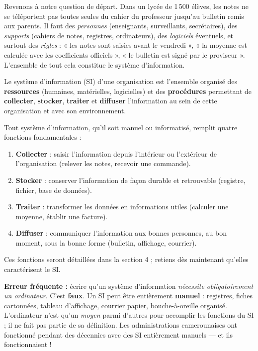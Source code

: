 \documentclass[11pt]{article}
\newcommand{\cle}[1]{{\popxbold\color{popdark}#1}}
\newcounter{popsec}
\newcounter{popsub}
\newcommand{\courssub}[1]{%
  \stepcounter{popsub}%
  \par\vspace{9pt}\noindent{\popxbold\fontsize{11.5}{13}\selectfont\color{popink}{\color{poporange}\thepopsec.\thepopsub}\hspace{6pt}#1}\par\nopagebreak\vspace{4pt}
}
\begin{document}
\courssub{Le système d'information (SI)}

Revenons à notre question de départ. Dans un lycée de 1\,500 élèves, les notes ne se téléportent pas toutes seules du cahier du professeur jusqu'au bulletin remis aux parents. Il faut des \emph{personnes} (enseignants, surveillants, secrétaires), des \emph{supports} (cahiers de notes, registres, ordinateurs), des \emph{logiciels} éventuels, et surtout des \emph{règles} : « les notes sont saisies avant le vendredi », « la moyenne est calculée avec les coefficients officiels », « le bulletin est signé par le proviseur ». L'ensemble de tout cela constitue le système d'information.

\begin{definition}
Le \cle{système d'information} (SI) d'une organisation est l'ensemble organisé des \textbf{ressources} (humaines, matérielles, logicielles) et des \textbf{procédures} permettant de \textbf{collecter}, \textbf{stocker}, \textbf{traiter} et \textbf{diffuser} l'information au sein de cette organisation et avec son environnement.
\end{definition}

\begin{aretenir}
Tout système d'information, qu'il soit manuel ou informatisé, remplit quatre fonctions fondamentales :
\begin{enumerate}
  \item \textbf{Collecter} : saisir l'information depuis l'intérieur ou l'extérieur de l'organisation (relever les notes, recevoir une commande).
  \item \textbf{Stocker} : conserver l'information de façon durable et retrouvable (registre, fichier, base de données).
  \item \textbf{Traiter} : transformer les données en informations utiles (calculer une moyenne, établir une facture).
  \item \textbf{Diffuser} : communiquer l'information aux bonnes personnes, au bon moment, sous la bonne forme (bulletin, affichage, courrier).
\end{enumerate}
Ces fonctions seront détaillées dans la section 4 ; retiens dès maintenant qu'elles caractérisent le SI.
\end{aretenir}

\begin{attention}
\textbf{Erreur fréquente :} écrire qu'un système d'information \emph{nécessite obligatoirement un ordinateur}. C'est \textbf{faux}. Un SI peut être entièrement \textbf{manuel} : registres, fiches cartonnées, tableau d'affichage, courrier papier, bouche-à-oreille organisé. L'ordinateur n'est qu'un \emph{moyen} parmi d'autres pour accomplir les fonctions du SI ; il ne fait pas partie de sa définition. Les administrations camerounaises ont fonctionné pendant des décennies avec des SI entièrement manuels — et ils fonctionnaient !
\end{attention}
\end{document}

